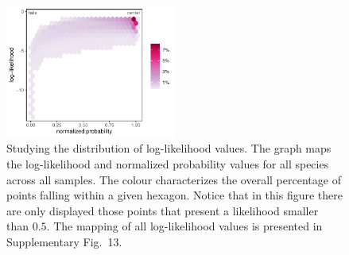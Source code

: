 \documentclass[11pt, a4paper]{article}
\begin{document}
\begin{figure}[ht]
  \centering
    \includegraphics[width=0.5\textwidth]{figures/loglik-notshow-bin}
    	  \vspace{0.1cm}
	   \caption{Studying the distribution of log-likelihood values. The graph maps the log-likelihood and normalized probability values for all species across all samples. The colour characterizes the overall percentage of points falling within a given hexagon. Notice that in this figure there are only displayed those points that present a likelihood smaller than $0.5$. The mapping of all log-likelihood values is presented in Supplementary Fig.~13.}
      \label{fig:loglik}
\end{figure}




\end{document}
